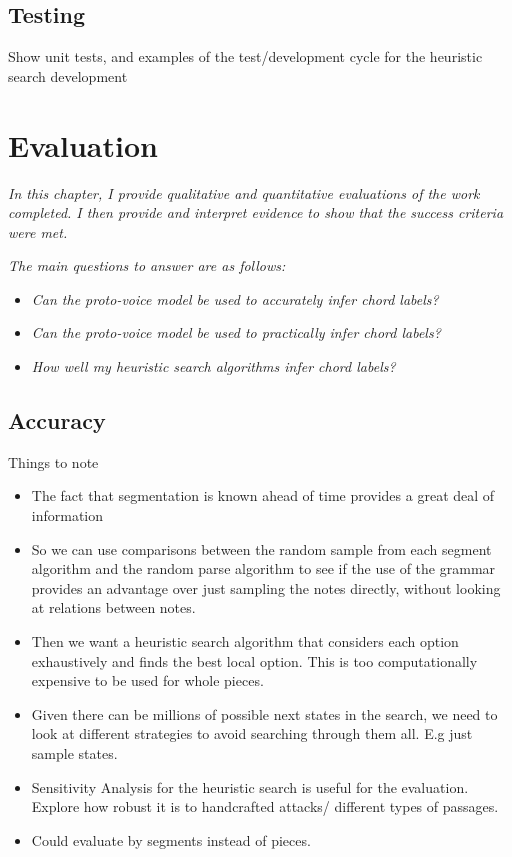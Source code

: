 \documentclass[12pt,a4paper,twoside,openright]{report}
\theoremstyle{definition}
\begin{document}
\section{Testing}
Show unit tests, and examples of the test/development cycle for the heuristic search development


\chapter{Evaluation}
\textit{In this chapter, I provide qualitative and quantitative evaluations of the work completed. I then provide and interpret evidence to show that the success criteria were met.}

\textit{The main questions to answer are as follows:}
\begin{itemize}
  \item \textit{Can the proto-voice model be used to accurately infer chord labels?}
  \item \textit{Can the proto-voice model be used to practically infer chord labels?}
  \item \textit{How well my heuristic search algorithms infer chord labels?}
\end{itemize}

\section{Accuracy}
Things to note
\begin{itemize}
  \item The fact that segmentation is known ahead of time provides a great deal of information \cite{gothamWhatIfWhen2021}
  \item So we can use comparisons between the random sample from each segment algorithm and the random parse algorithm to see if the use of the grammar provides an advantage over just sampling the notes directly, without looking at relations between notes.
  \item Then we want a heuristic search algorithm that considers each option exhaustively and finds the best local option. This is too computationally expensive to be used for whole pieces. 
  \item Given there can be millions of possible next states in the search, we need to look at different strategies to avoid searching through them all. E.g just sample states. 
  \item Sensitivity Analysis for the heuristic search is useful for the evaluation. Explore how robust it is to handcrafted attacks/ different types of passages.
  \item Could evaluate by segments instead of pieces. 
\end{itemize}
\end{document}
